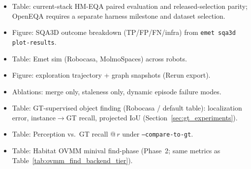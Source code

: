 \begin{itemize}
  \item Table: current-stack HM-EQA paired evaluation and released-selection parity; OpenEQA requires a separate harness milestone and dataset selection.
  \item Figure: SQA3D outcome breakdown (TP/FP/FN/infra) from \texttt{emet sqa3d plot-results}.
  \item Table: Emet sim (Robocasa, MolmoSpaces) across robots.
  \item Figure: exploration trajectory + graph snapshots (Rerun export).
  \item Ablations: merge only, staleness only, dynamic episode failure modes.
  \item Table: GT-supervised object finding (Robocasa / default table): localization error, instance$\rightarrow$GT recall, projected IoU (Section~\ref{sec:gt_experiments}).
  \item Table: Perception vs.\ GT recall @\,$r$ under \texttt{--compare-to-gt}.
  \item Table: Habitat OVMM minival find-phase (Phase~2; same metrics as Table~\ref{tab:ovmm_find_backend_tier}).
\end{itemize}
